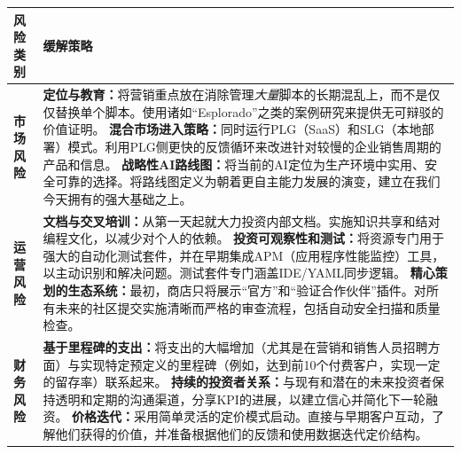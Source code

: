 \documentclass[11pt, a4paper, oneside]{article}
\begin{document}
\begin{table}[H]
\centering
\begin{tabularx}{\textwidth}{@{}lL@{}}
\toprule
\textbf{风险类别} & \textbf{缓解策略} \\
\midrule
\textbf{市场风险} & 
\textbf{定位与教育：}将营销重点放在消除管理\textit{大量}脚本的长期混乱上，而不是仅仅替换单个脚本。使用诸如“Esplorado”之类的案例研究来提供无可辩驳的价值证明。 \newline\newline
\textbf{混合市场进入策略：}同时运行PLG（SaaS）和SLG（本地部署）模式。利用PLG侧更快的反馈循环来改进针对较慢的企业销售周期的产品和信息。 \newline\newline
\textbf{战略性AI路线图：}将当前的AI定位为生产环境中实用、安全可靠的选择。将路线图定义为朝着更自主能力发展的演变，建立在我们今天拥有的强大基础之上。 \\
\addlinespace
\textbf{运营风险} & 
\textbf{文档与交叉培训：}从第一天起就大力投资内部文档。实施知识共享和结对编程文化，以减少对个人的依赖。 \newline\newline
\textbf{投资可观察性和测试：}将资源专门用于强大的自动化测试套件，并在早期集成APM（应用程序性能监控）工具，以主动识别和解决问题。测试套件专门涵盖IDE/YAML同步逻辑。 \newline\newline
\textbf{精心策划的生态系统：}最初，商店只将展示“官方”和“验证合作伙伴”插件。对所有未来的社区提交实施清晰而严格的审查流程，包括自动安全扫描和质量检查。 \\
\addlinespace
\textbf{财务风险} & 
\textbf{基于里程碑的支出：}将支出的大幅增加（尤其是在营销和销售人员招聘方面）与实现特定预定义的里程碑（例如，达到前10个付费客户，实现一定的留存率）联系起来。 \newline\newline
\textbf{持续的投资者关系：}与现有和潜在的未来投资者保持透明和定期的沟通渠道，分享KPI的进展，以建立信心并简化下一轮融资。 \newline\newline
\textbf{价格迭代：}采用简单灵活的定价模式启动。直接与早期客户互动，了解他们获得的价值，并准备根据他们的反馈和使用数据迭代定价结构。 \\
\bottomrule
\end{tabularx}
\end{table}

\newpage
\end{document}
